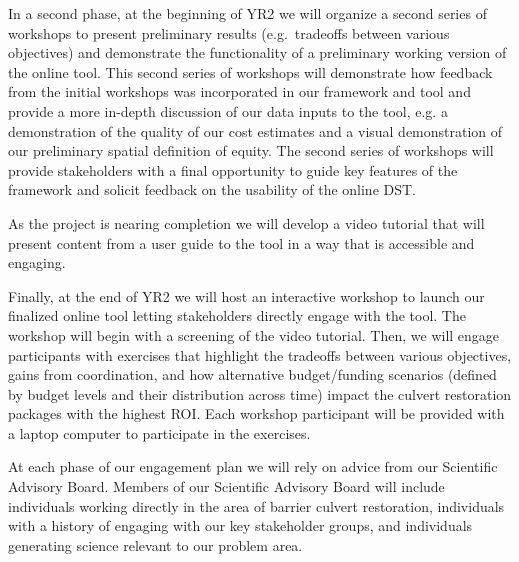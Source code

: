 \documentclass[12pt]{elsarticle}
\begin{document}
In a second phase, at the beginning of YR2 we will organize a second series of workshops to present preliminary results (e.g.\ tradeoffs between various objectives) and demonstrate the functionality of a preliminary working version of the online tool. This second series of workshops will demonstrate how feedback from the initial workshops was incorporated in our framework and tool and provide a more in-depth discussion of our data inputs to the tool, e.g. a demonstration of the quality of our cost estimates and a visual demonstration of our preliminary spatial definition of equity. The second series of workshops will provide stakeholders with a final opportunity to guide key features of the framework and solicit feedback on the usability of the online DST.

As the project is nearing completion we will develop a video tutorial that will present content from a user guide to the tool in a way that is accessible and engaging.

Finally, at the end of YR2 we will host an interactive workshop to launch our finalized online tool letting stakeholders directly engage with the tool. The workshop will begin with a screening of the video tutorial. Then, we will engage participants with exercises that highlight the tradeoffs between various objectives, gains from coordination, and how alternative budget/funding scenarios (defined by budget levels and their distribution across time) impact the culvert restoration packages with the highest ROI. Each workshop participant will be provided with a laptop computer to participate in the exercises. 

At each phase of our engagement plan we will rely on advice from our Scientific Advisory Board. Members of our Scientific Advisory Board will include individuals working directly in the area of barrier culvert restoration, individuals with a history of engaging with our key stakeholder groups, and individuals generating science relevant to our problem area. 


\end{document}
